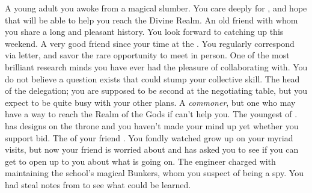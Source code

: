 \documentclass[char]{GL2020}
\begin{document}
\begin{contacts}
    \contact{\cDisney{}} A young adult you awoke from a magical slumber. You care deeply for \cDisney{\them}, and hope that \cDisney{\they} will be able to help you reach the Divine Realm.
    \contact{\cHistory{}} An old friend with whom you share a long and pleasant history. You look forward to catching up this weekend.
    \contact{\cHedonist{}} A very good friend since your time at the \pSchool{}. You regularly correspond via letter, and savor the rare opportunity to meet in person. 
    \contact{\cLibrarian{}} One of the most brilliant research minds you have ever had the pleasure of collaborating with. You do not believe a question exists that could stump your collective skill.
    \contact{\cEvil{}} The head of the \pFarm{} delegation; you are supposed to be \cEvil{\their} second at the negotiating table, but you expect to be quite busy with your other plans.
    \contact{\cCurse{}} A \emph{commoner}, but one who may have a way to reach the Realm of the Gods if \cDisney{} can’t help you.
    \contact{\cPrince{}} The youngest \cPrince{\offspring} of \cQueen{\Monarch} \cQueen{}. \cPrince{} has designs on the throne and you haven’t made your mind up yet whether you support \cPrince{\their} bid.
    \contact{\cChupStudent{}} The \cChupStudent{\offspring} of your friend \cWildCardFriend{}. You fondly watched \cChupStudent{\them} grow up on your myriad visits, but now your friend is worried about \cChupStudent{} and has asked you to see if you can get \cChupStudent{\them} to open up to you about what is going on.
    \contact{\cBunker{}} The \pShippie{} engineer charged with maintaining the school’s magical Bunkers, whom you suspect of being a spy. You had \cDisney{} steal notes from \cBunker{\them} to see what could be learned.
\end{contacts}
\end{document}
